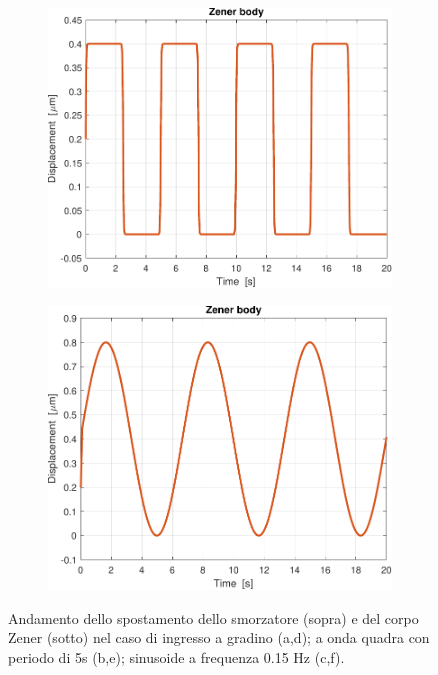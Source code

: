 \begin{figure}[t!]
\begin{subfigure}{0.33\linewidth}
		\includegraphics[width=0.95\linewidth]{../code/figs/square_zener_}
		\caption{}
	\end{subfigure}\hfill
	\begin{subfigure}{0.33\linewidth}
		\centering
		\includegraphics[width=0.95\linewidth]{../code/figs/harmonic_zener_}
		\caption{}
	\end{subfigure}\hfill
	\caption{Andamento dello spostamento dello smorzatore (sopra) e del corpo Zener (sotto) nel caso di ingresso a gradino (a,d); a onda quadra con periodo di 5s (b,e); sinusoide a frequenza 0.15 Hz (c,f).}
	\label{fig:separati}
\end{figure}

